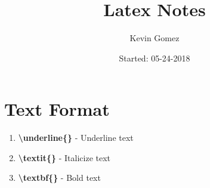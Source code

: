 \documentclass{article}
\title{Latex Notes}
\date{Started: 05-24-2018}
\author{Kevin Gomez}
\begin{document}
	
	\maketitle
	\newpage
	
	\section{Text Format}
		\begin{enumerate}
			\item \textbf{\textbackslash underline\{\}} - Underline text
			\item \textbf{\textbackslash textit\{\}} - Italicize text
			\item \textbf{\textbackslash textbf\{\}} - Bold text
		\end{enumerate}
\end{document}
